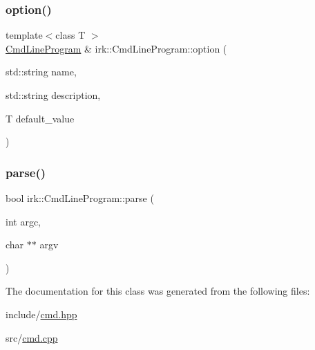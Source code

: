 \subsubsection{\texorpdfstring{option()}{option()}\hspace{0.1cm}{\footnotesize\ttfamily [2/2]}}
{\footnotesize\ttfamily template$<$class T $>$ \\
\mbox{\hyperlink{classirk_1_1CmdLineProgram}{Cmd\+Line\+Program}} \& irk\+::\+Cmd\+Line\+Program\+::option (\begin{DoxyParamCaption}\item[{std\+::string}]{name,  }\item[{std\+::string}]{description,  }\item[{T}]{default\+\_\+value }\end{DoxyParamCaption})\hspace{0.3cm}{\ttfamily [inline]}}

\mbox{\label{classirk_1_1CmdLineProgram_aa19c7e41705d5201da87a03037c9303d}} 
\subsubsection{\texorpdfstring{parse()}{parse()}}
{\footnotesize\ttfamily bool irk\+::\+Cmd\+Line\+Program\+::parse (\begin{DoxyParamCaption}\item[{int}]{argc,  }\item[{char $\ast$$\ast$}]{argv }\end{DoxyParamCaption})\hspace{0.3cm}{\ttfamily [inline]}}



The documentation for this class was generated from the following files\+:\begin{DoxyCompactItemize}
\item 
include/\mbox{\hyperlink{cmd_8hpp}{cmd.\+hpp}}\item 
src/\mbox{\hyperlink{cmd_8cpp}{cmd.\+cpp}}\end{DoxyCompactItemize}
